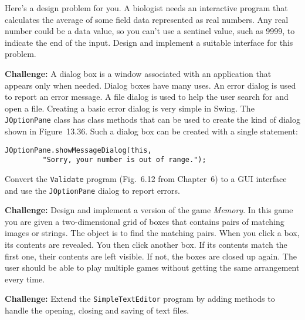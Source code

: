 \begin{EXRtwo}
\item  Here's a design problem for you. A biologist needs an
interactive program that calculates the average of some field data
represented as real numbers. Any real number could be a data value, so
you can't use a sentinel value, such as 9999, to indicate the end of
the input. Design and implement a suitable interface for this problem.

\item  {\bf Challenge:} A dialog box is a window associated
with an application that appears only when needed. Dialog boxes have
many uses. An error dialog is used to report an error message.  A file
dialog is used to help the user search for and open a file. Creating a
basic error dialog is very simple in Swing. The {\tt JOptionPane}
class has class methods that can be used to create the kind of dialog
shown in Figure~13.36. Such a dialog box can be created
with a single statement:


\begin{jjjlisting}
\begin{lstlisting}
JOptionPane.showMessageDialog(this, 
         "Sorry, your number is out of range.");
\end{lstlisting}
\end{jjjlisting}

\noindent Convert the {\tt Validate} program (Fig.~6.12 from
Chapter~6) to a GUI interface and use the {\tt JOptionPane} dialog to
report errors.


\item  {\bf Challenge:} Design and implement a version of the
game {\it Memory}.  In this game you are given a two-dimensional grid
of boxes that contains pairs of matching images or strings. The object
is to find the matching pairs. When you click a box, its contents
are revealed. You then click another box. If its contents match the
first one, their contents are left visible.  If not, the boxes are
closed up again. The user should be able to play multiple games
without getting the same arrangement every time.

\item {\bf Challenge:} Extend the {\tt SimpleTextEditor} program by
adding methods to handle the opening, closing and saving of text
files.

\end{EXRtwo}
